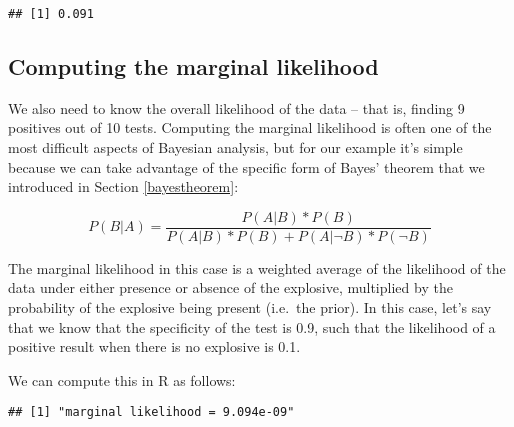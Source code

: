 \documentclass[]{book}
\newenvironment{Shaded}{\begin{snugshade}}{\end{snugshade}}
\newcommand{\KeywordTok}[1]{\textcolor[rgb]{0.13,0.29,0.53}{\textbf{#1}}}
\newcommand{\DataTypeTok}[1]{\textcolor[rgb]{0.13,0.29,0.53}{#1}}
\newcommand{\DecValTok}[1]{\textcolor[rgb]{0.00,0.00,0.81}{#1}}
\newcommand{\FloatTok}[1]{\textcolor[rgb]{0.00,0.00,0.81}{#1}}
\newcommand{\StringTok}[1]{\textcolor[rgb]{0.31,0.60,0.02}{#1}}
\newcommand{\OperatorTok}[1]{\textcolor[rgb]{0.81,0.36,0.00}{\textbf{#1}}}
\newcommand{\NormalTok}[1]{#1}
\theoremstyle{definition}
\theoremstyle{definition}
\theoremstyle{definition}
\theoremstyle{remark}
\begin{document}
\begin{verbatim}
## [1] 0.091
\end{verbatim}

\subsection{Computing the marginal
likelihood}\label{computing-the-marginal-likelihood}

We also need to know the overall likelihood of the data -- that is,
finding 9 positives out of 10 tests. Computing the marginal likelihood
is often one of the most difficult aspects of Bayesian analysis, but for
our example it's simple because we can take advantage of the specific
form of Bayes' theorem that we introduced in Section \ref{bayestheorem}:

\[
P(B|A) = \frac{P(A|B)*P(B)}{P(A|B)*P(B) + P(A|\neg B)*P(\neg B)}
\]

The marginal likelihood in this case is a weighted average of the
likelihood of the data under either presence or absence of the
explosive, multiplied by the probability of the explosive being present
(i.e.~the prior). In this case, let's say that we know that the
specificity of the test is 0.9, such that the likelihood of a positive
result when there is no explosive is 0.1.

We can compute this in R as follows:

\begin{Shaded}
\end{Shaded}

\begin{verbatim}
## [1] "marginal likelihood = 9.094e-09"
\end{verbatim}
\end{document}
